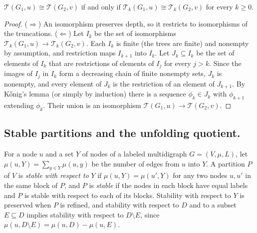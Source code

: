 \documentclass[twoside,leqno]{article}
\newcommand{\Unf}{\mathcal{T}}
\newcommand{\iso}{\cong}
\begin{document}
\begin{lemma}
\label{lem:truncation}
$\Unf(G_1,u)\iso\Unf(G_2,v)$ if and only if $\Unf_k(G_1,u)\iso\Unf_k(G_2,v)$ for every $k\ge 0$.
\end{lemma}
\begin{proof}
($\Rightarrow$) An isomorphism preserves depth, so it restricts to isomorphisms of the truncations.
($\Leftarrow$) Let $I_k$ be the set of isomorphisms $\Unf_k(G_1,u) \to \Unf_k(G_2,v)$. Each $I_k$ is finite (the trees are finite) and nonempty by assumption, and restriction maps $I_{k+1}$ into $I_k$. Let $J_k \subseteq I_k$ be the set of elements of $I_k$ that are restrictions of elements of $I_j$ for every $j > k$. Since the images of $I_j$ in $I_k$ form a decreasing chain of finite nonempty sets, $J_k$ is nonempty, and every element of $J_k$ is the restriction of an element of $J_{k+1}$. By K\H{o}nig's lemma \cite{konig1936theorie} (or simply by induction) there is a sequence $\phi_k \in J_k$ with $\phi_{k+1}$ extending $\phi_k$. Their union is an isomorphism $\Unf(G_1,u)\to\Unf(G_2,v)$.
\end{proof}

\subsection{Stable partitions and the unfolding quotient.}
\label{sec:quotient}
For a node $u$ and a set $Y$ of nodes of a labeled multidigraph $G=(V,\mu,L)$, let $\mu(u,Y)=\sum_{y\in Y}\mu(u,y)$ be the number of edges from $u$ into $Y$. A partition $P$ of $V$ is \emph{stable with respect to} $Y$ if $\mu(u,Y)=\mu(u',Y)$ for any two nodes $u,u'$ in the same block of $P$, and $P$ is \emph{stable} if the nodes in each block have equal labels and $P$ is stable with respect to each of its blocks. Stability with respect to $Y$ is preserved when $P$ is refined, and stability with respect to $D$ and to a subset $E\subseteq D$ implies stability with respect to $D\setminus E$, since $\mu(u,D\setminus E)=\mu(u,D)-\mu(u,E)$.
\end{document}
